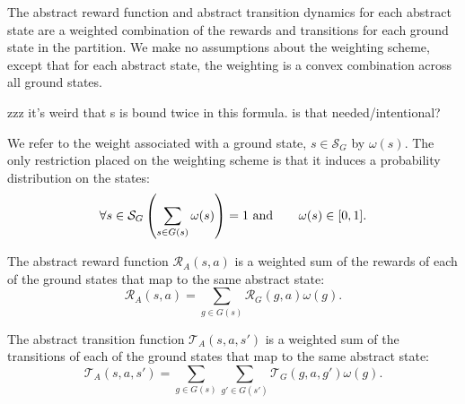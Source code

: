 The abstract reward function and abstract transition dynamics for each abstract state are a weighted combination of the rewards and transitions for each ground state in the partition. We make no assumptions about the weighting scheme, except that for each abstract state, the weighting is a convex combination across all ground states.

zzz it's weird that s is bound twice in this formula. is that needed/intentional?

We refer to the weight associated with a ground state, $s \in \mathcal{S}_G$ by $\omega(s)$. The only restriction placed on the weighting scheme is that it induces a probability distribution on the states:
\begin{equation}
\forall s \in \mathcal{S}_G \left(\sum_{s \in G(s)} \omega(s)\right) = 1 \textrm{ and }\hspace{6mm}  \omega(s) \in [0,1].
\end{equation}
\edefn

The abstract reward function $\mathcal{R}_A(s,a)$ is a weighted sum of the rewards of each of the ground states that map to the same abstract state:
\begin{equation}
\mathcal{R}_A(s,a) = \sum_{g \in G(s)} \mathcal{R}_G(g,a) \omega(g) .
\end{equation}
\edefn

The abstract transition function $\mathcal{T}_A(s,a,s')$ is a weighted sum of the transitions of each of the ground states that map to the same abstract state:
\begin{equation}
\mathcal{T}_A(s,a,s') = \sum_{g \in G(s)} \sum_{g' \in G(s')} \mathcal{T}_G(g,a,g') \omega(g).
\end{equation}
\edefn












